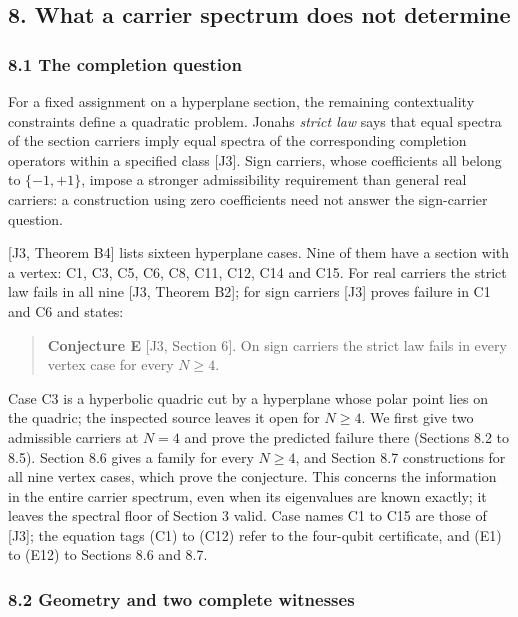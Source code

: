\documentclass[11pt,a4paper]{article}
\begin{document}
\subsection{8. What a carrier spectrum does not determine}\label{8-what-a-carrier-spectrum-does-not-determine}

\subsubsection{8.1 The completion question}\label{81-the-completion-question}

For a fixed assignment on a hyperplane section, the remaining contextuality constraints define a
quadratic problem. Jonah\textquotesingle s \emph{strict law} says that equal spectra of the section carriers imply equal
spectra of the corresponding completion operators within a specified class {[}J3{]}. Sign carriers,
whose coefficients all belong to \(\{-1,+1\}\), impose a stronger admissibility requirement than general
real carriers: a construction using zero coefficients need not answer the sign-carrier question.

{[}J3, Theorem B4{]} lists sixteen hyperplane cases. Nine of them have a section with a vertex: C1, C3,
C5, C6, C8, C11, C12, C14 and C15. For real carriers the strict law fails in all nine
{[}J3, Theorem B2{]}; for sign carriers {[}J3{]} proves failure in C1 and C6 and states:

\begin{quote}
\textbf{Conjecture E} {[}J3, Section 6{]}. On sign carriers the strict law fails in every vertex case for every \(N\ge4\).
\end{quote}

Case C3 is a hyperbolic quadric cut by a hyperplane whose polar point lies on the quadric; the
inspected source leaves it open for \(N\ge4\). We first give two admissible carriers at \(N=4\) and prove
the predicted failure there (Sections 8.2 to 8.5). Section 8.6 gives a family for every \(N\ge4\), and
Section 8.7 constructions for all nine vertex cases, which prove the conjecture. This concerns the
information in the entire carrier spectrum, even when its eigenvalues are known exactly; it leaves
the spectral floor of Section 3 valid. Case names C1 to C15 are those of {[}J3{]}; the equation tags
(C1) to (C12) refer to the four-qubit certificate, and (E1) to (E12) to Sections 8.6 and 8.7.

\subsubsection{8.2 Geometry and two complete witnesses}\label{82-geometry-and-two-complete-witnesses}
\end{document}

